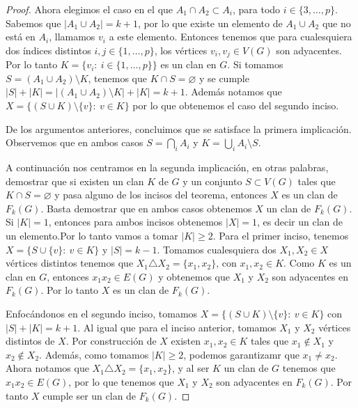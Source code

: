\begin{proof}
        Ahora elegimos el caso en el que $A_1 \cap A_2 \subset A_i$, para todo
        $i\in \{3, \dots, p\}$. Sabemos que $|A_1 \cup A_2| = k+1$, por lo que
        existe un elemento de $A_1 \cup A_2$ que no est\'a en $A_i$, llamamos
        $v_i$ a este elemento. Entonces tenemos que para cualesquiera dos
        \'indices distintos $i, j \in \{1, \dots, p\}$, los v\'ertices $v_i, v_j
        \in V(G)$ son adyacentes. Por lo tanto $K= \{v_i\colon\ i \in \{1,
        \dots, p\}\}$ es un clan en $G$. Si tomamos $S= (A_1 \cup A_2)\setminus
        K$, tenemos que $K \cap S = \varnothing$ y se cumple $|S| + |K|= |(A_1
        \cup A_2)\setminus K| + |K| = k+1$. Adem\'as notamos que $X = \{(S \cup
        K)\setminus \{v\}\colon\ v\in K\}$ por lo que obtenemos el caso del
        segundo inciso.

        De los argumentos anteriores, concluimos que se satisface la primera
        implicaci\'on. Observemos que en ambos casos $S = \bigcap\limits_{i}
        A_i$ y $K = \bigcup\limits_{i} A_i \setminus S$.
        
        A continuaci\'on nos centramos en la segunda implicaci\'on, en otras
        palabras, demostrar que si existen un clan $K$ de $G$ y un conjunto $S
        \subset V(G)$ tales que $K \cap S = \varnothing$ y pasa alguno de los
        incisos del teorema, entonces $X$ es un clan de $F_k(G)$. Basta
        demostrar que en ambos casos obtenemos $X$ un clan de $F_k(G)$. Si $|K|
        =1$, entonces para ambos incisos obtenemos $|X| =1$, es decir un clan de
        un elemento.Por lo tanto vamos a tomar $|K| \geq 2$. Para el primer
        inciso, tenemos $X = \{S \cup \{v\}\colon\ v \in K\}$ y $|S| = k-1$.
        Tomamos cualesquiera dos $X_1, X_2 \in X$ v\'ertices distintos tenemos
        que $X_1 \triangle X_2 =\{x_1, x_2\}$, con $x_1, x_2 \in K$. Como $K$ es
        un clan en $G$, entonces $x_1x_2 \in E(G)$ y obtenemos que $X_1$ y $X_2$
        son adyacentes en $F_k(G)$. Por lo tanto $X$ es un clan de $F_k(G)$.

        Enfoc\'andonos en el segundo inciso, tomamos $X = \{(S\cup K) \setminus
        \{v\}\colon\ v \in K \}$ con $|S| + |K| = k+1$. Al igual que para el
        inciso anterior, tomamos $X_1$ y $X_2$ v\'ertices distintos de $X$. Por
        construcci\'on de $X$ existen $x_1, x_2 \in K$ tales que $x_1 \notin
        X_1$ y $x_2 \notin X_2$. Adem\'as, como tomamos $|K| \geq 2$, podemos
        garantizamr que $x_1 \neq x_2$. Ahora notamos que $X_1 \triangle X_2 =
        \{x_1, x_2\}$, y al ser $K$ un clan de $G$ tenemos que $x_1x_2 \in
        E(G)$, por lo que tenemos que $X_1$ y $X_2$ son adyacentes en $F_k(G)$.
        Por tanto $X$ cumple ser un clan de $F_k(G)$.
    \end{proof}
    
